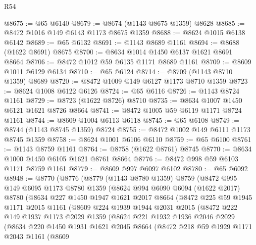 \begin{lexlean}{R54}
\begin{coremodule}
@8675 := @65 @6140
@8679 := @8674 (@1143 @8675 @1359) @8628
@8685 := @8472 @1016 @149 @6143 @1173 @8675 @1359
@8688 := @8624 @1015 @6138 @6142
@8689 := @65 @6132
@8691 := @1143 @8689 @1161
@8694 := @8688 (@1622 @8691) @8675
@8700 := @8634 @1014 @1450 @6137 @1621 @8691 @8664
@8706 := @8472 @1012 @59 @6135 @1171 @8689 @1161
@8709 := @8609 @1011 @6129 @6134
@8710 := @65 @6124
@8714 := @8709 (@1143 @8710 @1359) @8689
@8720 := @8472 @1009 @149 @6127 @1173 @8710 @1359
@8723 := @8624 @1008 @6122 @6126
@8724 := @65 @6116
@8726 := @1143 @8724 @1161
@8729 := @8723 (@1622 @8726) @8710
@8735 := @8634 @1007 @1450 @6121 @1621 @8726 @8664
@8741 := @8472 @1005 @59 @6119 @1171 @8724 @1161
@8744 := @8609 @1004 @6113 @6118
@8745 := @65 @6108
@8749 := @8744 (@1143 @8745 @1359) @8724
@8755 := @8472 @1002 @149 @6111 @1173 @8745 @1359
@8758 := @8624 @1001 @6106 @6110
@8759 := @65 @6100
@8761 := @1143 @8759 @1161
@8764 := @8758 (@1622 @8761) @8745
@8770 := @8634 @1000 @1450 @6105 @1621 @8761 @8664
@8776 := @8472 @998 @59 @6103 @1171 @8759 @1161
@8779 := @8609 @997 @6097 @6102
@8780 := @65 @6092
@8948 := @8770
    (@8776
      (@8779
        (@1143 @8780 @1359)
        @8759
        (@8472
          @995
          @149
          @6095
          @1173
          @8780
          @1359
          (@8624
            @994
            @6090
            @6094
            (@1622 @2017)
            @8780
            (@8634
              @227
              @1450
              @1947
              @1621
              @2017
              @8664
              (@8472
                @225
                @59
                @1945
                @1171
                @2015
                @1161
                (@8609
                  @224
                  @1939
                  @1944
                  @2031
                  @2015
                  (@8472
                    @222
                    @149
                    @1937
                    @1173
                    @2029
                    @1359
                    (@8624
                      @221
                      @1932
                      @1936
                      @2046
                      @2029
                      (@8634
                        @220
                        @1450
                        @1931
                        @1621
                        @2045
                        @8664
                        (@8472
                          @218
                          @59
                          @1929
                          @1171
                          @2043
                          @1161
                          (@8609

\end{coremodule}
\end{lexlean}
